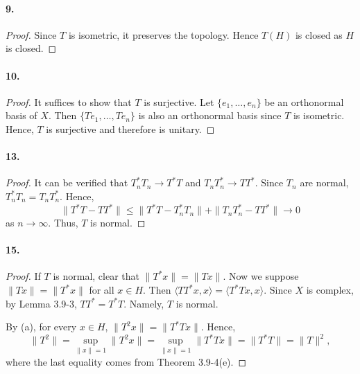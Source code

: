   \paragraph{9.}
  \begin{proof}
    Since $T$ is isometric, it preserves the topology. Hence $T(H)$ is closed
    as $H$ is closed.
  \end{proof}
  
  \paragraph{10.}
  \begin{proof}
    It suffices to show that $T$ is surjective. Let $\{e_1,\dots,e_n\}$ be an
    orthonormal basis of $X$. Then $\{Te_1,\dots,Te_n\}$ is also an orthonormal
    basis since $T$ is isometric. Hence, $T$ is surjective and therefore is
    unitary.
  \end{proof}
  
  \paragraph{13.}
  \begin{proof}
    It can be verified that $T_n^*T_n\to T^*T$ and $T_nT_n^*\to TT^*$. Since
    $T_n$ are normal, $T_n^*T_n=T_nT_n^*$. Hence, 
    \[
      \|T^*T-TT^*\|\le \|T^*T-T_n^*T_n\|+\|T_nT_n^*-TT^*\|\to 0
    \]
    as $n\to\infty$. Thus, $T$ is normal.
  \end{proof}
  
  \paragraph{15.}
  \begin{proof}
    If $T$ is normal, clear that $\|T^*x\|=\|Tx\|$. Now we suppose $\|Tx\|=\|T^*
    x\|$ for all $x\in H$. Then $\langle TT^*x,x\rangle=\langle T^*Tx,x\rangle$.
    Since $X$ is complex, by Lemma 3.9-3, $TT^*=T^*T$. Namely, $T$ is normal.
    \par
    By (a), for every $x\in H$, $\|T^2x\|=\|T^*Tx\|$. Hence,
    \[
      \|T^2\|=\sup_{\|x\|=1}\|T^2x\|=\sup_{\|x\|=1}\|T^*Tx\|=\|T^*T\|=\|T\|^2,
    \]
    where the last equality comes from Theorem 3.9-4(e).
  \end{proof}















